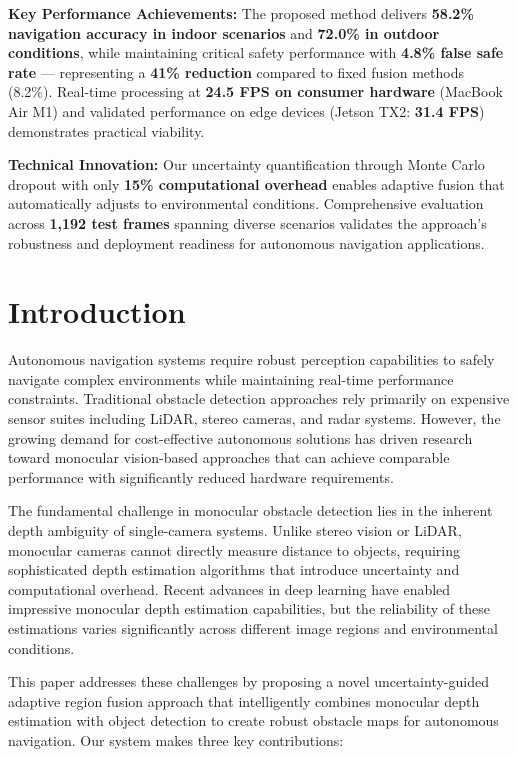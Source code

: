 \documentclass[12pt,oneside]{book}
\begin{document}
\textbf{Key Performance Achievements:} The proposed method delivers \textbf{58.2\% navigation accuracy in indoor scenarios} and \textbf{72.0\% in outdoor conditions}, while maintaining critical safety performance with \textbf{4.8\% false safe rate} — representing a \textbf{41\% reduction} compared to fixed fusion methods (8.2\%). Real-time processing at \textbf{24.5 FPS on consumer hardware} (MacBook Air M1) and validated performance on edge devices (Jetson TX2: \textbf{31.4 FPS}) demonstrates practical viability.

\textbf{Technical Innovation:} Our uncertainty quantification through Monte Carlo dropout with only \textbf{15\% computational overhead} enables adaptive fusion that automatically adjusts to environmental conditions. Comprehensive evaluation across \textbf{1,192 test frames} spanning diverse scenarios validates the approach's robustness and deployment readiness for autonomous navigation applications.
\clearpage

\chapter{Introduction}

Autonomous navigation systems require robust perception capabilities to safely navigate complex environments while maintaining real-time performance constraints. Traditional obstacle detection approaches rely primarily on expensive sensor suites including LiDAR, stereo cameras, and radar systems. However, the growing demand for cost-effective autonomous solutions has driven research toward monocular vision-based approaches that can achieve comparable performance with significantly reduced hardware requirements.

The fundamental challenge in monocular obstacle detection lies in the inherent depth ambiguity of single-camera systems. Unlike stereo vision or LiDAR, monocular cameras cannot directly measure distance to objects, requiring sophisticated depth estimation algorithms that introduce uncertainty and computational overhead. Recent advances in deep learning have enabled impressive monocular depth estimation capabilities, but the reliability of these estimations varies significantly across different image regions and environmental conditions.

This paper addresses these challenges by proposing a novel uncertainty-guided adaptive region fusion approach that intelligently combines monocular depth estimation with object detection to create robust obstacle maps for autonomous navigation. Our system makes three key contributions:
\end{document}
